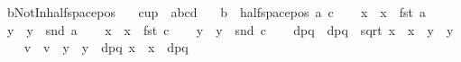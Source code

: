 \begin{isabellebody}
\isamarkupfalse%
%
\endisatagproof
{\isafoldproof}%
%
\isadelimproof
\isanewline
%
\endisadelimproof
\isanewline
{}\isamarkupfalse%
\ bNotInhalfspace{\isacharunderscore}{\kern0pt}pos{\isacharcolon}{\kern0pt}\isanewline
\ \ \ {\isachardoublequoteopen}cup\ {}\ {\isacharbrackleft}{\kern0pt}a{\isacharcomma}{\kern0pt}b{\isacharcomma}{\kern0pt}c{\isacharcomma}{\kern0pt}d{\isacharbrackright}{\kern0pt}{\isachardoublequoteclose}\isanewline
\ \ \ {\isachardoublequoteopen}b\ {\isasymnotin}\ halfspace{\isacharunderscore}{\kern0pt}pos\ a\ c{\isachardoublequoteclose}\isanewline
%
\isadelimproof
%
\endisadelimproof
%
\isatagproof
{}\isamarkupfalse%
{\isacharminus}{\kern0pt}\isanewline
\ \ \isamarkupfalse%
\ x{}\ \ {\isachardoublequoteopen}x{}\ {\isasymequiv}\ fst\ a{\isachardoublequoteclose}\isanewline
\ \ \isamarkupfalse%
\ y{}\ \ {\isachardoublequoteopen}y{}\ {\isasymequiv}\ snd\ a{\isachardoublequoteclose}\isanewline
\ \ \isamarkupfalse%
\ x{}\ \ {\isachardoublequoteopen}x{}\ {\isasymequiv}\ fst\ c{\isachardoublequoteclose}\isanewline
\ \ \isamarkupfalse%
\ y{}\ \ {\isachardoublequoteopen}y{}\ {\isasymequiv}\ snd\ c{\isachardoublequoteclose}\isanewline
\ \ \isamarkupfalse%
\ dpq\ \ {\isachardoublequoteopen}dpq\ {\isasymequiv}\ sqrt\ {\isacharparenleft}{\kern0pt}{\isacharparenleft}{\kern0pt}x{}\ {\isacharminus}{\kern0pt}\ x{}{\isacharparenright}{\kern0pt}{\isacharcircum}{\kern0pt}{}\ {\isacharplus}{\kern0pt}\ {\isacharparenleft}{\kern0pt}y{}\ {\isacharminus}{\kern0pt}\ y{}{\isacharparenright}{\kern0pt}{\isacharcircum}{\kern0pt}{}{\isacharparenright}{\kern0pt}{\isachardoublequoteclose}\isanewline
\ \ \isamarkupfalse%
\ v\ \ {\isachardoublequoteopen}v\ {\isasymequiv}\ {\isacharparenleft}{\kern0pt}{\isacharparenleft}{\kern0pt}y{}\ {\isacharminus}{\kern0pt}\ y{}{\isacharparenright}{\kern0pt}\ {\isacharslash}{\kern0pt}\ dpq{\isacharcomma}{\kern0pt}\ {\isacharparenleft}{\kern0pt}x{}\ {\isacharminus}{\kern0pt}\ x{}{\isacharparenright}{\kern0pt}\ {\isacharslash}{\kern0pt}\ dpq{\isacharparenright}{\kern0pt}{\isachardoublequoteclose}\isanewline

\end{isabellebody}
